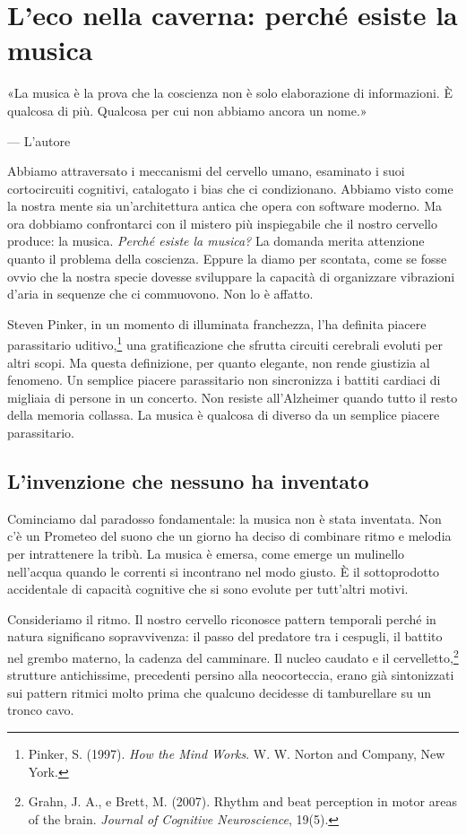 \chapter{L'eco nella caverna: perch\'{e} esiste la musica}
\label{cap:p4c40}

\epigraph{«La musica è la prova che la coscienza non è solo elaborazione di informazioni. È qualcosa di più. Qualcosa per cui non abbiamo ancora un nome.»}{— L'autore}

Abbiamo attraversato i meccanismi del cervello umano, esaminato i suoi cortocircuiti cognitivi, catalogato i bias che ci condizionano. Abbiamo visto come la nostra mente sia un'architettura antica che opera con software moderno. Ma ora dobbiamo confrontarci con il mistero pi\`{u} inspiegabile che il nostro cervello produce: la musica.
\bigskip
\textit{Perch\'{e} esiste la musica?}
\bigskip
La domanda merita attenzione quanto il problema della coscienza. Eppure la diamo per scontata, come se fosse ovvio che la nostra specie dovesse sviluppare la capacit\`{a} di organizzare vibrazioni d'aria in sequenze che ci commuovono. Non lo \`{e} affatto.

Steven Pinker, in un momento di illuminata franchezza, l'ha definita piacere parassitario uditivo,\footnote{Pinker, S. (1997). \textit{How the Mind Works}. W. W. Norton and Company, New York.} una gratificazione che sfrutta circuiti cerebrali evoluti per altri scopi. Ma questa definizione, per quanto elegante, non rende giustizia al fenomeno. Un semplice piacere parassitario non sincronizza i battiti cardiaci di migliaia di persone in un concerto. Non resiste all'Alzheimer quando tutto il resto della memoria collassa. La musica \`{e} qualcosa di diverso da un semplice piacere parassitario.

\section{L'invenzione che nessuno ha inventato}

Cominciamo dal paradosso fondamentale: la musica non \`{e} stata inventata. Non c'\`{e} un Prometeo del suono che un giorno ha deciso di combinare ritmo e melodia per intrattenere la trib\`{u}. La musica \`{e} emersa, come emerge un mulinello nell'acqua quando le correnti si incontrano nel modo giusto. \`{E} il sottoprodotto accidentale di capacit\`{a} cognitive che si sono evolute per tutt'altri motivi.

Consideriamo il ritmo. Il nostro cervello riconosce pattern temporali perch\'{e} in natura significano sopravvivenza: il passo del predatore tra i cespugli, il battito nel grembo materno, la cadenza del camminare. Il nucleo caudato e il cervelletto,\footnote{Grahn, J. A., e Brett, M. (2007). Rhythm and beat perception in motor areas of the brain. \textit{Journal of Cognitive Neuroscience}, 19(5).} strutture antichissime, precedenti persino alla neocorteccia, erano gi\`{a} sintonizzati sui pattern ritmici molto prima che qualcuno decidesse di tamburellare su un tronco cavo.

